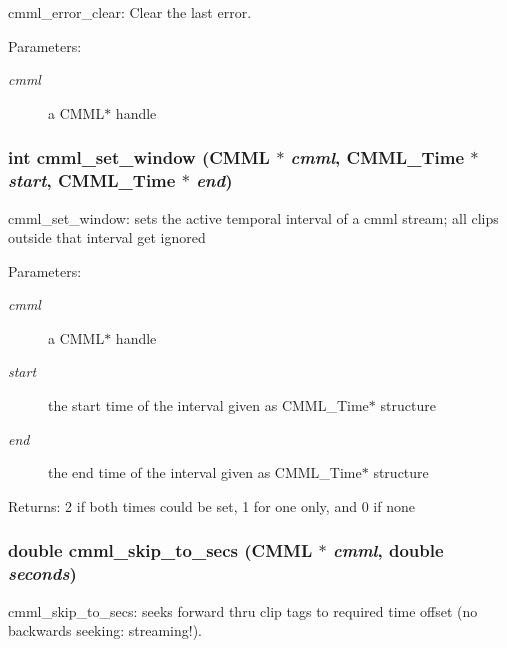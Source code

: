cmml\_\-error\_\-clear: Clear the last error.

\begin{Desc}
\item[Parameters:]
\begin{description}
\item[{\em cmml}]a CMML$\ast$ handle \end{description}
\end{Desc}
\subsubsection{\setlength{\rightskip}{0pt plus 5cm}int cmml\_\-set\_\-window ({\bf CMML} $\ast$ {\em cmml}, {\bf CMML\_\-Time} $\ast$ {\em start}, {\bf CMML\_\-Time} $\ast$ {\em end})}\label{cmml_8h_a51}


cmml\_\-set\_\-window: sets the active temporal interval of a cmml stream; all clips outside that interval get ignored

\begin{Desc}
\item[Parameters:]
\begin{description}
\item[{\em cmml}]a CMML$\ast$ handle \item[{\em start}]the start time of the interval given as CMML\_\-Time$\ast$ structure \item[{\em end}]the end time of the interval given as CMML\_\-Time$\ast$ structure\end{description}
\end{Desc}
\begin{Desc}
\item[Returns:]2 if both times could be set, 1 for one only, and 0 if none \end{Desc}
\subsubsection{\setlength{\rightskip}{0pt plus 5cm}double cmml\_\-skip\_\-to\_\-secs ({\bf CMML} $\ast$ {\em cmml}, double {\em seconds})}\label{cmml_8h_a52}


cmml\_\-skip\_\-to\_\-secs: seeks forward thru clip tags to required time offset (no backwards seeking: streaming!).

